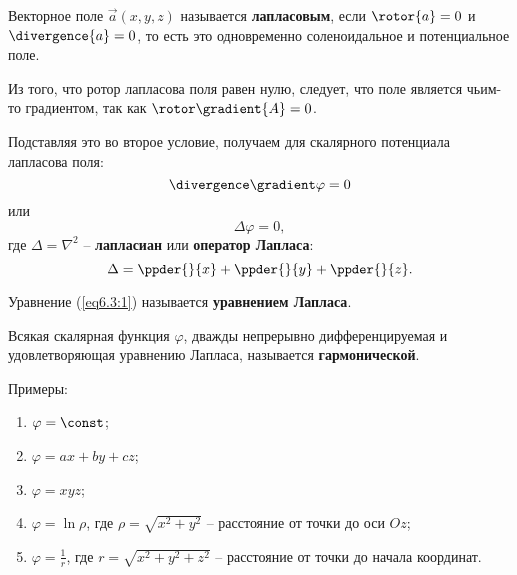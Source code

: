 	\begin{definition}
	Векторное поле \( \vec{a}(x, y, z) \) называется \textbf{лапласовым}, если \( \rotor{a} = 0 \) и \( \divergence{a} = 0 \), то есть это одновременно соленоидальное и потенциальное поле.
	\end{definition}
	
	Из того, что ротор лапласова поля равен нулю, следует, что поле является чьим-то градиентом, так как \( \rotor\gradient{A} = 0 \).
	
	Подставляя это во второе условие, получаем для скалярного потенциала лапласова поля:
	\[ \divergence\gradient\varphi = 0 \]
	или
	\begin{equation}
		\Delta\varphi = 0, \label{eq6.3:1}
	\end{equation}
	где \( \Delta = \nabla^2 \) -- \textbf{лапласиан} или \textbf{оператор Лапласа}:
	\[ \Delta = \ppder{}{x} + \ppder{}{y} + \ppder{}{z}. \]
	
	Уравнение (\ref{eq6.3:1}) называется \textbf{уравнением Лапласа}.
	
	\begin{definition}
	Всякая скалярная функция \( \varphi \), дважды непрерывно дифференцируемая и удовлетворяющая уравнению Лапласа, называется \textbf{гармонической}.
	\end{definition}
	
	Примеры:
	\begin{enumerate}
	\item \( \varphi = \const \);
	\item \( \varphi = ax + by + cz \);
	\item \( \varphi = xyz \);
	\item \( \varphi = \ln\rho \), где \( \rho = \sqrt{x^2 + y^2} \) -- расстояние от точки до оси \( Oz \);
	\item \( \varphi = \frac{1}{r} \), где \( r = \sqrt{x^2 + y^2 + z^2} \) -- расстояние от точки до начала координат.
	\end{enumerate}
